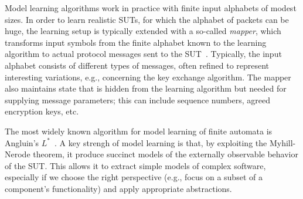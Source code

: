 \documentclass[11pt]{article}
\begin{document}

Model learning algorithms work in practice with finite input alphabets of modest sizes. In order to learn realistic SUTs, for which the alphabet of packets can be huge, the learning setup is typically extended with
a so-called \emph{mapper}, which
transforms input symbols from the finite alphabet known to the learning algorithm to actual protocol
messages sent to the SUT~\cite{AJUV15}.
Typically, the input alphabet consists of different types of messages, often
refined to represent interesting variations, e.g., concerning the key exchange algorithm.
The mapper also maintains state that is hidden from the
learning algorithm but needed for supplying message parameters; this can include sequence numbers, agreed encryption keys, etc.

The most widely known algorithm for model learning of finite automata 
is Angluin's $L^*$~\cite{Angluin1987}.
A key strengh of model learning is that, by exploiting the Myhill-Nerode theorem, it produce succinct models of
the externally observable behavior of the SUT.
%
This allows it to extract simple models of complex software, especially if
we choose the right perspective (e.g., focus on a subset of a component's
functionality) and apply appropriate abstractions.
\end{document}
